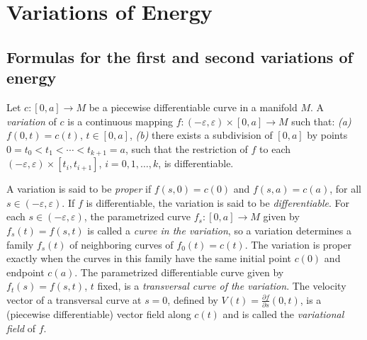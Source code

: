 \chapter{Variations of Energy}
\label{chap:dc-variations-of-energy}
\section{Formulas for the first and second variations of energy}

\begin{definition}[variation]
  \label{def:dc-ch9-2-1}
  \leanok
  Let $c:[0,a]\to M$ be a piecewise differentiable curve in a manifold $M$. A
  \emph{variation} of $c$ is a continuous mapping $f:(-\varepsilon,\varepsilon)\times[0,a]\to M$
  such that:
  \emph{(a)} $f(0,t)=c(t)$, $t\in[0,a]$,
  \emph{(b)} there exists a subdivision of $[0,a]$ by points
  $0=t_0<t_1<\cdots<t_{k+1}=a$, such that the restriction of $f$ to each
  $(-\varepsilon,\varepsilon)\times[t_i,t_{i+1}]$, $i=0,1,\dots,k$, is differentiable.

  A variation is said to be \emph{proper} if $f(s,0)=c(0)$ and $f(s,a)=c(a)$, for all
  $s\in(-\varepsilon,\varepsilon)$. If $f$ is differentiable, the variation is said to be
  \emph{differentiable}. For each $s\in(-\varepsilon,\varepsilon)$, the parametrized curve
  $f_s:[0,a]\to M$ given by $f_s(t)=f(s,t)$ is called a \emph{curve in the variation}, so
  a variation determines a family $f_s(t)$ of neighboring curves of $f_0(t)=c(t)$.
  The variation is proper exactly when the curves in this family have the same
  initial point $c(0)$ and endpoint $c(a)$.
  The parametrized differentiable curve given by $f_t(s)=f(s,t)$, $t$ fixed, is a
  \emph{transversal curve of the variation}. The velocity vector of a transversal curve
  at $s=0$, defined by $V(t)=\frac{\partial f}{\partial s}(0,t)$, is a (piecewise
  differentiable) vector field along $c(t)$ and is called the \emph{variational field} of
  $f$.
\end{definition}
